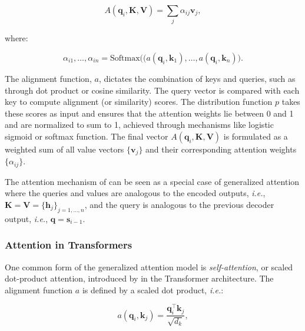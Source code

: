 \begin{equation}
    A(\bm{q}_i, \bm{K}, \bm{V}) = \sum_j \alpha_{ij} \bm{v}_j,
\end{equation}

\noindent where:

\begin{equation}
    \alpha_{i1}, \ldots, \alpha_{in} = \textrm{Softmax}\bigl((a(\bm{q}_{i}, \bm{k}_1), \ldots, a(\bm{q}_{i}, \bm{k}_n)\bigr).
\end{equation}


\noindent The alignment function, $a$, dictates the combination of keys and queries, such as through dot product or cosine similarity. The query vector is compared with each key to compute alignment (or similarity) scores. The distribution function $p$ takes these scores as input and ensures that the attention weights lie between 0 and 1 and are normalized to sum to 1, achieved through mechanisms like logistic sigmoid or softmax function. The final vector $A(\bm{q}_i, \bm{K}, \bm{V})$ is formulated as a weighted sum of all value vectors $\{\bm{v}_j\}$ and their corresponding attention weights $\{\alpha_{ij}\}$.

The attention mechanism of \citet{bahdanau2014neural} can be seen as a special case of generalized attention where the queries and values are analogous to the encoded outputs, \textit{i.e.}, $\bm{K} = \bm{V} = \{\bm{h}_j\}_{j=1, \ldots, n}$, and the query is analogous to the previous decoder output, \textit{i.e.}, $\bm{q} = \bm{s}_{i-1}$. 


\subsubsection{Attention in Transformers} 
\label{subsubsection:related-pretrained-language-models-sa}

One common form of the generalized attention model is \textit{self-attention}, or scaled dot-product attention, introduced by \citet{vaswani2017attention} in the Transformer architecture. The alignment function $a$ is defined by a scaled dot product, \textit{i.e.}: 

\begin{equation}
\label{equation:related-pretrained-language-models-sa-alignment}
    a(\bm{q}_i, \bm{k}_j) = \frac{\bm{q}_i^{\top} \bm{k}_j}{\sqrt{d_k}}, 
\end{equation}

